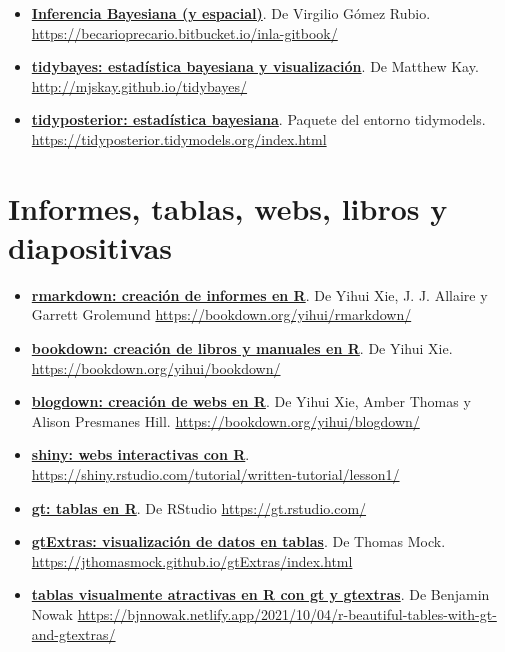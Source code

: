 \documentclass[11pt,]{book}
\begin{document}
\begin{itemize}
\item
  \href{https://becarioprecario.bitbucket.io/inla-gitbook/}{\textbf{Inferencia Bayesiana (y espacial)}}. De Virgilio Gómez Rubio. \url{https://becarioprecario.bitbucket.io/inla-gitbook/}
\item
  \href{http://mjskay.github.io/tidybayes/}{\textbf{tidybayes: estadística bayesiana y visualización}}. De Matthew Kay. \url{http://mjskay.github.io/tidybayes/}
\item
  \href{https://tidyposterior.tidymodels.org/index.html}{\textbf{tidyposterior: estadística bayesiana}}. Paquete del entorno tidymodels. \url{https://tidyposterior.tidymodels.org/index.html}
\end{itemize}

\hypertarget{informes-tablas-webs-libros-y-diapositivas}{%
\section*{Informes, tablas, webs, libros y diapositivas}\label{informes-tablas-webs-libros-y-diapositivas}}


\begin{itemize}
\item
  \href{https://bookdown.org/yihui/rmarkdown/}{\textbf{rmarkdown: creación de informes en R}}. De Yihui Xie, J. J. Allaire y Garrett Grolemund \url{https://bookdown.org/yihui/rmarkdown/}
\item
  \href{https://bookdown.org/yihui/bookdown/}{\textbf{bookdown: creación de libros y manuales en R}}. De Yihui Xie. \url{https://bookdown.org/yihui/bookdown/}
\item
  \href{https://bookdown.org/yihui/blogdown/}{\textbf{blogdown: creación de webs en R}}. De Yihui Xie, Amber Thomas y Alison Presmanes Hill. \url{https://bookdown.org/yihui/blogdown/}
\item
  \href{https://shiny.rstudio.com/tutorial/written-tutorial/lesson1/}{\textbf{shiny: webs interactivas con R}}. \url{https://shiny.rstudio.com/tutorial/written-tutorial/lesson1/}
\item
  \href{https://gt.rstudio.com/}{\textbf{gt: tablas en R}}. De RStudio \url{https://gt.rstudio.com/}
\item
  \href{https://jthomasmock.github.io/gtExtras/index.html}{\textbf{gtExtras: visualización de datos en tablas}}. De Thomas Mock. \url{https://jthomasmock.github.io/gtExtras/index.html}
\item
  \href{https://bjnnowak.netlify.app/2021/10/04/r-beautiful-tables-with-gt-and-gtextras/}{\textbf{tablas visualmente atractivas en R con gt y gtextras}}. De Benjamin Nowak \url{https://bjnnowak.netlify.app/2021/10/04/r-beautiful-tables-with-gt-and-gtextras/}
\end{itemize}
\end{document}
